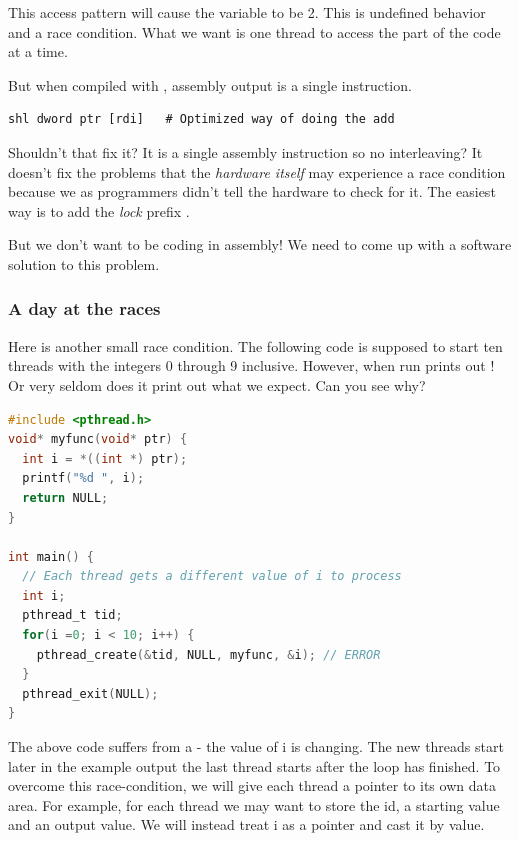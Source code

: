 This access pattern will cause the variable  to be 2.
This is undefined behavior and a race condition.
What we want is one thread to access the part of the code at a time.

But when compiled with , assembly output is a single instruction.

\begin{lstlisting}[language={[x86masm]Assembler}]
shl dword ptr [rdi]   # Optimized way of doing the add
\end{lstlisting}

Shouldn't that fix it? It is a single assembly instruction so no interleaving?
It doesn't fix the problems that the \textit{hardware itself} may experience a race condition because we as programmers didn't tell the hardware to check for it.
The easiest way is to add the \textit{lock} prefix \cite[p. 1120]{guide2011intel}.

But we don't want to be coding in assembly!
We need to come up with a software solution to this problem.

\subsubsection{A day at the races}

Here is another small race condition.
The following code is supposed to start ten threads with the integers 0 through 9 inclusive.
However, when run prints out !
Or very seldom does it print out what we expect.
Can you see why?

\begin{lstlisting}[language=C]
#include <pthread.h>
void* myfunc(void* ptr) {
  int i = *((int *) ptr);
  printf("%d ", i);
  return NULL;
}

int main() {
  // Each thread gets a different value of i to process
  int i;
  pthread_t tid;
  for(i =0; i < 10; i++) {
    pthread_create(&tid, NULL, myfunc, &i); // ERROR
  }
  pthread_exit(NULL);
}
\end{lstlisting}

The above code suffers from a  - the value of i is changing.
The new threads start later in the example output the last thread starts after the loop has finished.
To overcome this race-condition, we will give each thread a pointer to its own data area.
For example, for each thread we may want to store the id, a starting value and an output value.
We will instead treat i as a pointer and cast it by value.

